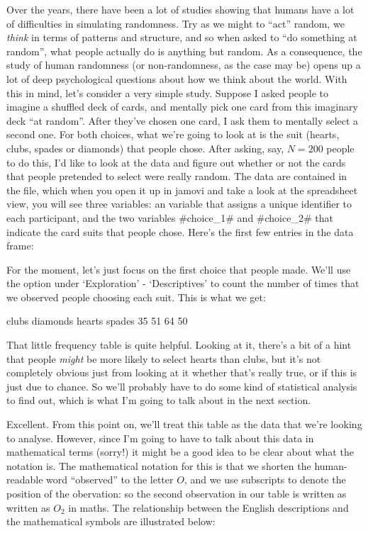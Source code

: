 Over the years, there have been a lot of studies showing that humans have a lot of difficulties in simulating randomness. Try as we might to ``act'' random, we {\it think} in terms of patterns and structure, and so when asked to ``do something at random'', what people actually do is anything but random. As a consequence, the study of human randomness (or non-randomness, as the case may be) opens up a lot of deep psychological questions about how we think about the world. With this in mind, let's consider a very simple study. Suppose I asked people to imagine a shuffled deck of cards, and mentally pick one card from this imaginary deck ``at random''. After they've chosen one card, I ask them to mentally select a second one. For both choices, what we're going to look at is the suit (hearts, clubs, spades or diamonds) that people chose. After asking, say, $N=200$ people to do this, I'd like to look at the data and figure out whether or not the cards that people pretended to select were really random. The data are contained in the  file, which when you open it up in jamovi and take a look at the spreadsheet view, you will see three variables: an  variable that assigns a unique identifier to each participant, and the two variables \rtextverb#choice_1# and \rtextverb#choice_2# that indicate the card suits that people chose. Here's the first few entries in the data frame:

For the moment, let's just focus on the first choice that people made. We'll use the  option under `Exploration' - `Descriptives' to count the number of times that we observed people choosing each suit. This is what we get: 

\begin{rblock1}
   clubs diamonds   hearts   spades 
      35       51       64       50      
\end{rblock1}

That little frequency table is quite helpful. Looking at it, there's a bit of a hint that people {\it might} be more likely to select hearts than clubs, but it's not completely obvious just from looking at it whether that's really true, or if this is just due to chance. So we'll probably have to do some kind of statistical analysis to find out, which is what I'm going to talk about in the next section. 
 

Excellent. From this point on, we'll treat this table as the data that we're looking to analyse. However, since I'm going to have to talk about this data in mathematical terms (sorry!) it might be a good idea to be clear about what the notation is. The mathematical notation for this is that we shorten the human-readable word ``observed'' to the letter $O$, and we use subscripts to denote the position of the obervation: so the second observation in our table is written as written as $O_2$ in maths. The relationship between the English descriptions and the mathematical symbols are illustrated below: 

